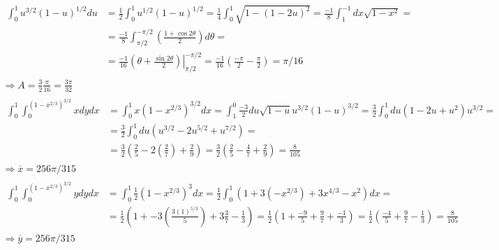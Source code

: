 \documentclass[twoside]{amsart}
\theoremstyle{plain}
\theoremstyle{definition}
\begin{document}
\[
\begin{gathered}
  \begin{aligned}
    \int_0^1 u^{3/2} (1-u)^{1/2} du & = \frac{1}{2} \int_0^1 u^{1/2} (1-u)^{1/2} = \frac{1}{4} \int_0^1 \sqrt{ 1 - (1-2u)^2 } = \frac{-1}{8} \int_1^{-1} dx \sqrt{ 1 - x^2} = \\
    & = \frac{-1}{8} \int_{\pi/2}^{-\pi/2} \left( \frac{1+ \cos{2\theta}}{2} \right) d\theta = \\ 
    & = \frac{-1}{16} \left. \left( \theta + \frac{ \sin{2\theta}}{2} \right) \right|_{\pi/2}^{-\pi/2} = \frac{-1}{16} \left( \frac{-\pi}{2} - \frac{\pi}{2} \right) = \boxed{ \pi/16} 
  \end{aligned} \\
  \Longrightarrow A = \frac{3}{2} \frac{\pi}{16} = \boxed{ \frac{3\pi}{32} }
\end{gathered}
\]
\[
\begin{gathered}
  \begin{aligned}
  \int_0^1 \int_0^{(1-x^{2/3})^{3/2}} x dy dx & = \int_0^1 x(1-x^{2/3})^{3/2} dx = \int_1^0 \frac{-3}{2} du \sqrt{ 1-  u} u^{3/2} (1-u)^{3/2} = \frac{3}{2} \int_0^1 du(1 -2u + u^2) u^{3/2} = \\ 
  & = \frac{3}{2} \int_0^1 du (u^{3/2} - 2u^{5/2} + u^{7/2} ) = \\
  & = \frac{3}{2} \left( \frac{2}{5} - 2 \left( \frac{2}{7} \right) + \frac{2}{9} \right) = \frac{3}{2} \left( \frac{2}{5} - \frac{4}{7} + \frac{2}{9} \right) = \frac{8}{105}
  \end{aligned} \\
  \Longrightarrow \boxed{ \overline{x} = 256\pi/315 }
\end{gathered}
\]
\[
\begin{gathered}
  \begin{aligned}
    \int_0^1 \int_0^{(1-x^{2/3})^{3/2}} y dy dx & = \int_0^1 \frac{1}{2} ( 1 - x^{2/3})^3 dx = \frac{1}{2} \int_0^1 ( 1 + 3 (-x^{2/3} ) + 3 x^{4/3} - x^2 ) dx = \\ 
    & = \frac{1}{2} \left( 1 + -3 \left( \frac{ 3 (1)^{5/3}}{5} \right) + 3 \frac{3}{7} - \frac{1}{3} \right) = \frac{1}{2} \left( 1 + \frac{ -9}{5} + \frac{9}{7} + \frac{-1}{3} \right) = \frac{1}{2} \left( \frac{-4}{5} + \frac{9}{7} - \frac{1}{3}  \right) = \frac{8}{105}
  \end{aligned} \\
  \Longrightarrow \boxed{ \overline{y} = 256\pi/315 }
\end{gathered}
\]
\end{document}
